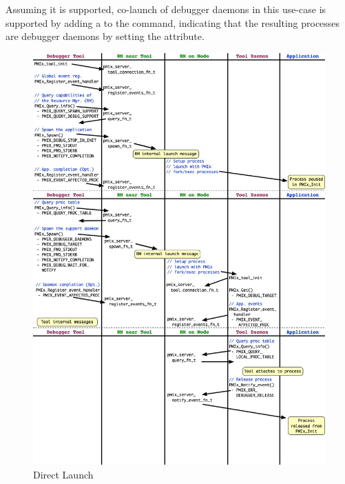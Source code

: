 Assuming it is supported, co-launch of debugger daemons in this use-case is supported by adding a  to the  command, indicating that the resulting processes are debugger daemons by setting the  attribute.

\begingroup
\begin{figure}
  \begin{center}
    \includegraphics[width=\textwidth,height=\textheight,keepaspectratio]{figs/direct-launch}
  \end{center}
  \caption{Direct Launch}
  \label{fig:direct_launch}
\end{figure}
\endgroup



{\large {}}

